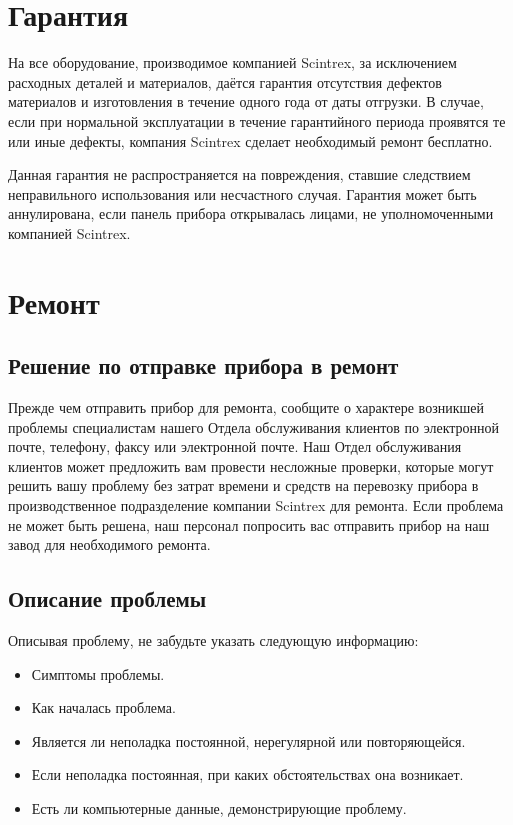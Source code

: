 
\section{Гарантия}
\label{sec:warranty}

На все оборудование, производимое компанией Scintrex, за исключением расходных
деталей и материалов, даётся гарантия отсутствия дефектов материалов и
изготовления в течение одного года от даты отгрузки. В случае, если при
нормальной эксплуатации в течение гарантийного периода проявятся те или иные
дефекты, компания Scintrex сделает необходимый ремонт бесплатно.

Данная гарантия не распространяется на повреждения, ставшие следствием
неправильного использования или несчастного случая. Гарантия может быть
аннулирована, если панель прибора открывалась лицами, не уполномоченными
компанией Scintrex.

\section{Ремонт}
\label{sec:repair}

\subsection{Решение по отправке прибора в ремонт}

Прежде чем отправить прибор для ремонта, сообщите о характере возникшей проблемы
специалистам нашего Отдела обслуживания клиентов по электронной почте, телефону,
факсу или электронной почте. Наш Отдел обслуживания клиентов может предложить
вам провести несложные проверки, которые могут решить вашу проблему без затрат
времени и средств на перевозку прибора в производственное подразделение компании
Scintrex для ремонта. Если проблема не может быть решена, наш персонал попросить
вас отправить прибор на наш завод для необходимого ремонта.

\subsection{Описание проблемы}

Описывая проблему, не забудьте указать следующую информацию:
\begin{itemize}
  \item Симптомы проблемы.

  \item Как началась проблема.

  \item Является ли неполадка постоянной, нерегулярной или повторяющейся.

  \item Если неполадка постоянная, при каких обстоятельствах она возникает.

  \item Есть ли компьютерные данные, демонстрирующие проблему.
\end{itemize}

